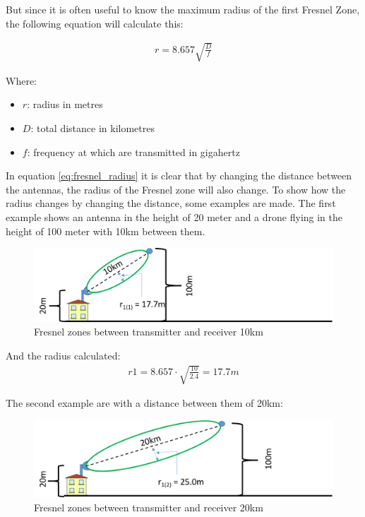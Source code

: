 But since it is often useful to know the maximum radius of the first Fresnel Zone, the following equation will calculate this:

\begin{align}
r= 8.657 \sqrt{\frac{D}{f}} \label{eq:fresnel_radius}
\end{align}

Where:
\begin{itemize}[label=]
    \item $r$: radius in metres
    \item $D$: total distance in kilometres
    \item $f$: frequency at which are transmitted in gigahertz
\end{itemize}

In equation \ref{eq:fresnel_radius} it is clear that by changing the distance between the antennas, the radius of the Fresnel zone will also change. To show how the radius changes by changing the distance, some examples are made. The first example shows an antenna in the height of 20 meter and a drone flying in the height of 100 meter with 10km between them.

\begin{figure}[h]
	\centering
	\includegraphics[scale=0.50]{figures/fresnel_10km.png}
	\caption{Fresnel zones between transmitter and receiver 10km}
	\label{fig:fresnel_zones_10km}
\end{figure}  

And the radius calculated:
\begin{align*}
r1 = 8.657\cdot \sqrt{\frac{10}{2.4}} = 17.7m
\end{align*}

The second example are with a distance between them of 20km:

\begin{figure}[h]
	\centering
	\includegraphics[scale=0.50]{figures/fresnel_20km.png}
	\caption{Fresnel zones between transmitter and receiver 20km}
	\label{fig:fresnel_zones_20km}
\end{figure}  

